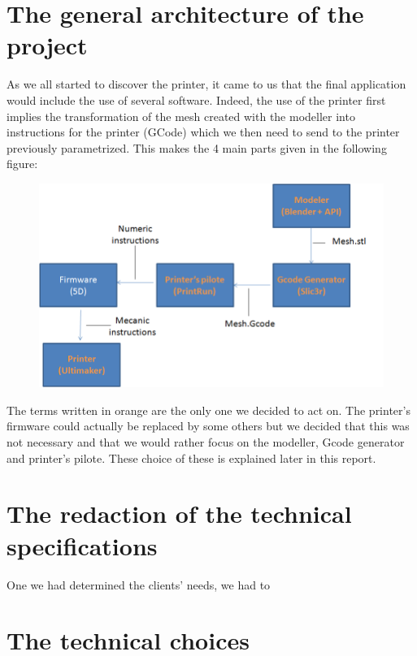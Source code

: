 \documentclass{report}
\begin{document}
\section{The general architecture of the project}

As we all started to discover the printer, it came to us that the final application would include the use of several software. Indeed, the use of the printer first implies the transformation of the mesh created with the modeller into instructions for the printer (GCode) which we then need to send to the printer previously parametrized. This makes the 4 main parts given in the following figure:

\begin{figure}[!h]
\begin{center}
	\includegraphics[scale=0.2]{ARD1}
\end{center}
\end{figure}

The terms written in orange are the only one we decided to act on. The printer's firmware could actually be replaced by some others but we decided that this was not necessary and that we would rather focus on the modeller, Gcode generator and printer's pilote. These choice of these is explained later in this report. 

\section{The redaction of the technical specifications}

One we had determined the clients' needs, we had to

\section{The technical choices}
\end{document}
